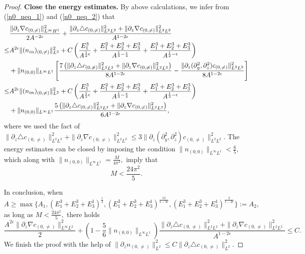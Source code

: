 \documentclass[10pt,a4paper]{amsart}
\begin{document}
\begin{proof}
		
		{\bf  Close the energy estimates.}
		By above calculations, we infer from (\ref{n0_neq_1}) and (\ref{n0_neq_2}) that 
		\begin{equation}\label{n0_neq_3}
			\begin{aligned}
				&\frac{\|\partial_z\nabla c_{(0,\neq)}\|^2_{L^{\infty}H^1}}{2A^{-2\epsilon}}
				+\frac{\|\partial_z\triangle c_{(0,\neq)}\|^2_{L^2L^2}+
					\|\partial_z\nabla c_{(0,\neq)}\|^2_{L^{2}L^2}}{A^{1-2\epsilon}}
				\\
				\leq& A^{2\epsilon}\|(n_{\rm in})_{(0,\neq)}\|^2_{L^2}+C\left(\frac{E_1^3}{ A^{\frac{1}{2}\epsilon}}
				+\frac{E_1^2+E_2^3+E_3^3}{ A^{\frac13-\frac{\epsilon}{4}}}
				+\frac{E_1^3+E_2^3+E_3^3}{ A^{\frac12-\epsilon}}\right)\\&+\|n_{(0,0)}\|_{L^\infty L^1}
				\left[
				\frac{7\left(\|\partial_z\triangle c_{(0,\neq)}\|_{L^2L^2}^2
					+\|\partial_z\nabla c_{(0,\neq)}\|_{L^2L^2}^2\right)
				}{8A^{1-2\epsilon}}-\frac{\|\partial_{z}(\partial_{y}^{2},\partial_{z}^{2})c_{(0,\neq)}\|_{L^{2}L^{2}}^{2}}{8A^{1-2\epsilon}}\right]
				\\\leq&A^{2\epsilon}\|(n_{\rm in})_{(0,\neq)}\|^2_{L^2}+C\left(\frac{E_1^3}{ A^{\frac{1}{2}\epsilon}}
				+\frac{E_1^2+E_2^3+E_3^3}{ A^{\frac13-\frac{\epsilon}{4}}}
				+\frac{E_1^3+E_2^3+E_3^3}{ A^{\frac12-\epsilon}}\right)\\&+\|n_{(0,0)}\|_{L^{\infty}L^{1}}\frac{5\left(\|\partial_z\triangle c_{(0,\neq)}\|_{L^2L^2}^2
					+\|\partial_z\nabla c_{(0,\neq)}\|_{L^2L^2}^2\right)}{6A^{1-2\epsilon}},
			\end{aligned}
		\end{equation}
		where we used the fact of $ \|\partial_{z}\triangle c_{(0,\neq)}\|_{L^{2}L^{2}}^{2}+\|\partial_{z}\nabla c_{(0,\neq)}\|_{L^{2}L^{2}}^{2}\leq 3\|\partial_{z}(\partial_{y}^{2}, \partial_{z}^{2})c_{(0,\neq)}\|_{L^{2}L^{2}}^{2}. $
		The energy estimates can be closed by imposing the condition
		$\|n_{(0,0)}\|_{L^\infty L^1}<\frac65,$
		which along with $\|n_{(0,0)}\|_{L^{\infty}L^1}=\frac{M}{4\pi^2},$
		imply that 
		\begin{equation*}
			M<\frac{24\pi^2}{5}.
		\end{equation*}
		
		In conclusion,
		when $$A\geq\max\{A_1,(E_1^3+E_2^3+E_3^1)^{\frac{\epsilon}{2}},
		(E_1^3+E_2^3+E_3^1)^{\frac{12}{4-3\epsilon}},(E_1^3+E_2^3+E_3^1)^{\frac{2}{1-2\epsilon}}\}:=A_2,$$ as long as $M< \frac{24\pi^2}{5},$
		there holds 
		\begin{equation*}
			\frac{A^{2\epsilon}\|\partial_z\nabla c_{(0,\neq)}\|^2_{L^{\infty}L^2}}{2}+\left(1-\frac56\|n_{(0,0)}\|_{L^{\infty}L^{1}} \right)
			\frac{\|\partial_z\triangle c_{(0,\neq)}\|_{L^2L^2}^2
				+\|\partial_z\nabla c_{(0,\neq)}\|_{L^2L^2}^2}{A^{1-2\epsilon}}
			\leq C.
		\end{equation*}
		We finish the proof with the help of 
		$\|\partial_zn_{(0,\neq)}\|_{L^{2}}^{2}\leq C\|\partial_z\triangle c_{(0,\neq)}\|_{L^{2}}^{2}$.
	\end{proof}
\end{document}
